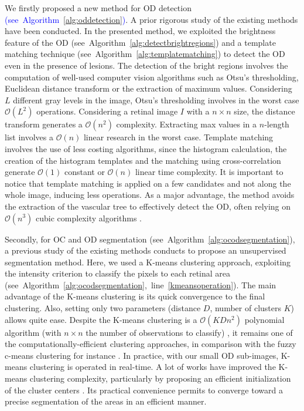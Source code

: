 We firstly proposed a new method for OD detection \textcolor{blue}{\mbox{(see Algorithm~\ref{alg:oddetection})}}. A prior rigorous study of the existing methods have been conducted. In the presented method, we exploited the brightness feature of the OD \mbox{(see Algorithm~\ref{alg:detectbrightregions})} and a template matching technique \mbox{(see Algorithm~\ref{alg:templatematching})} to detect the OD even in the presence of lesions. 
The detection of the bright regions involves the computation of well-used computer vision algorithms such as Otsu's thresholding, Euclidean distance transform or the extraction of maximum values. Considering $L$ different gray levels in the image, Otsu's thresholding involves in the worst case $\mathcal{O}(L^2)$ operations. Considering a retinal image $I$ with a $n \times n$ size, the distance transform generates a $\mathcal{O}(n^2)$ complexity. Extracting max values in a $n$-length list involves a $\mathcal{O}(n)$ linear research in the worst case. Template matching involves the use of less costing algorithms, since the histogram calculation, the creation of the histogram templates and the matching using cross-correlation generate $\mathcal{O}(1)$ constant or $\mathcal{O}(n)$ linear time complexity. It is important to notice that template matching is applied on a few candidates and not along the whole image, inducing less operations.
As a major advantage, the method avoids the extraction of the vascular tree to effectively detect the OD, often relying on $\mathcal{O}(n^3)$ cubic complexity algorithms \citep{sayadia2}.

Secondly, for OC and OD segmentation \mbox{(see Algorithm~\ref{alg:ocodsegmentation})}, a previous study of the existing methods conducts to propose an unsupervised segmentation method. Here, we used a K-means clustering approach, exploiting the intensity criterion to classify the pixels to each retinal area \mbox{(see Algorithm~\ref{alg:ocodsegmentation}, line \ref{kmeansoperation})}. The main advantage of the K-means clustering is its quick convergence to the final clustering. Also, setting only two parameters (distance $D$, number of clusters $K$) allows quite ease. Despite the K-means clustering is a $\mathcal{O}(KDn^2)$ polynomial algorithm (with $n \times n$ the number of observations to classify) \citep{Xu2015}, it remains one of the computationally-efficient clustering approaches, in comparison with the fuzzy c-means clustering for instance \citep{ghosh}. In practice, with our small OD sub-images, K-means clustering is operated in real-time. A lot of works have improved the K-means clustering complexity, particularly by proposing an efficient initialization of the cluster centers \citep{celebi}. Its practical convenience permits to converge toward a precise segmentation of the areas in an efficient manner. 

